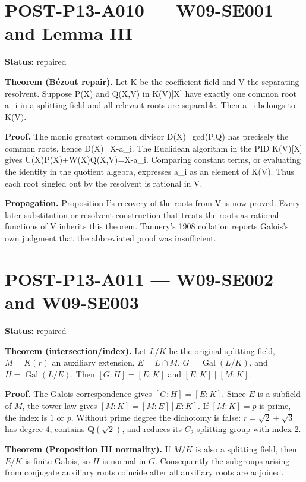 \documentclass[
  10pt,
  a4paper,
]{scrreprt}
\begin{document}
\section{POST-P13-A010 --- W09-SE001 and Lemma
III}\label{post-p13-a010-w09-se001-and-lemma-iii}

\textbf{Status:} repaired

\textbf{Theorem (Bézout repair).} Let K be the coefficient field and V
the separating resolvent. Suppose P(X) and Q(X,V) in K(V){[}X{]} have
exactly one common root a\_i in a splitting field and all relevant roots
are separable. Then a\_i belongs to K(V).

\textbf{Proof.} The monic greatest common divisor D(X)=gcd(P,Q) has
precisely the common roots, hence D(X)=X-a\_i. The Euclidean algorithm
in the PID K(V){[}X{]} gives U(X)P(X)+W(X)Q(X,V)=X-a\_i. Comparing
constant terms, or evaluating the identity in the quotient algebra,
expresses a\_i as an element of K(V). Thus each root singled out by the
resolvent is rational in V.

\textbf{Propagation.} Proposition I's recovery of the roots from V is
now proved. Every later substitution or resolvent construction that
treats the roots as rational functions of V inherits this theorem.
Tannery's 1908 collation reports Galois's own judgment that the
abbreviated proof was insufficient.

\section{POST-P13-A011 --- W09-SE002 and
W09-SE003}\label{post-p13-a011-w09-se002-and-w09-se003}

\textbf{Status:} repaired

\textbf{Theorem (intersection/index).} Let \(L/K\) be the original
splitting field, \(M=K(r)\) an auxiliary extension, \(E=L\cap M\),
\(G=\operatorname{Gal}(L/K)\), and \(H=\operatorname{Gal}(L/E)\). Then
\([G:H]=[E:K]\) and \([E:K]\mid[M:K]\).

\textbf{Proof.} The Galois correspondence gives \([G:H]=[E:K]\). Since
\(E\) is a subfield of \(M\), the tower law gives \([M:K]=[M:E][E:K]\).
If \([M:K]=p\) is prime, the index is \(1\) or \(p\). Without prime
degree the dichotomy is false: \(r=\sqrt2+\sqrt3\) has degree \(4\),
contains \(\mathbf Q(\sqrt2)\), and reduces its \(C_2\) splitting group
with index \(2\).

\textbf{Theorem (Proposition III normality).} If \(M/K\) is also a
splitting field, then \(E/K\) is finite Galois, so \(H\) is normal in
\(G\). Consequently the subgroups arising from conjugate auxiliary roots
coincide after all auxiliary roots are adjoined.
\end{document}
